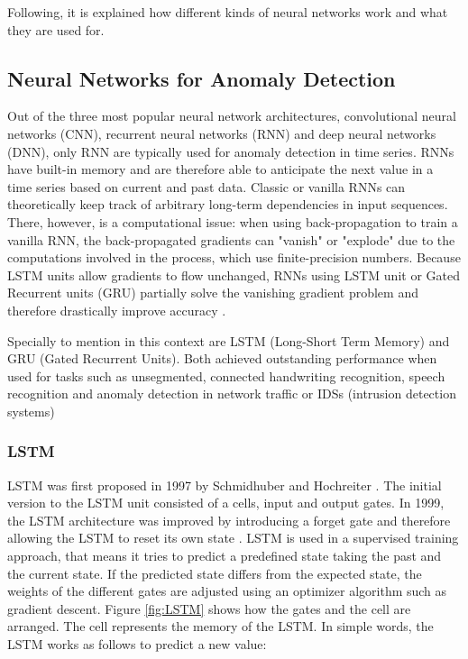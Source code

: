 Following, it is explained how different kinds of neural networks work and what they are used for.

\subsection{Neural Networks for Anomaly Detection} \label{NN}

Out of the three most popular neural network architectures, convolutional neural networks (CNN), recurrent neural networks (RNN) and deep neural networks (DNN), only RNN are typically used for anomaly detection in time series. RNNs have built-in memory and are therefore able to anticipate the next value in a time series based on current and past data. Classic or vanilla RNNs can theoretically keep track of arbitrary long-term dependencies in input sequences. There, however, is a computational issue: when using back-propagation to train a vanilla RNN, the back-propagated gradients can "vanish" or "explode" due to the computations involved in the process, which use finite-precision numbers. Because LSTM units allow gradients to flow unchanged, RNNs using LSTM unit or Gated Recurrent units (GRU) partially solve the vanishing gradient problem and therefore drastically improve accuracy \parencite{Hochreiter1997}.

Specially to mention in this context are LSTM (Long-Short Term Memory) and GRU (Gated Recurrent Units). Both achieved outstanding performance when used for tasks such as unsegmented, connected handwriting recognition, speech recognition and anomaly detection in network traffic or IDSs (intrusion detection systems) \parencite{JunyoungChung2014}

\subsubsection{LSTM} \label{LSTM}
LSTM was first proposed in 1997 by Schmidhuber and Hochreiter \parencite{Hochreiter1997}. The initial version to the LSTM unit consisted of a cells, input and output gates. In 1999, the LSTM architecture was improved by introducing a forget gate and therefore allowing the LSTM to reset its own state \parencite{Gers2000}. LSTM is used in a supervised training approach, that means it tries to predict a predefined state taking the past and the current state. If the predicted state differs from the expected state, the weights of the different gates are adjusted using an optimizer algorithm such as gradient descent. Figure \ref{fig:LSTM} shows how the gates and the cell are arranged. The cell represents the memory of the LSTM. In simple words, the LSTM works as follows to predict a new value: 

